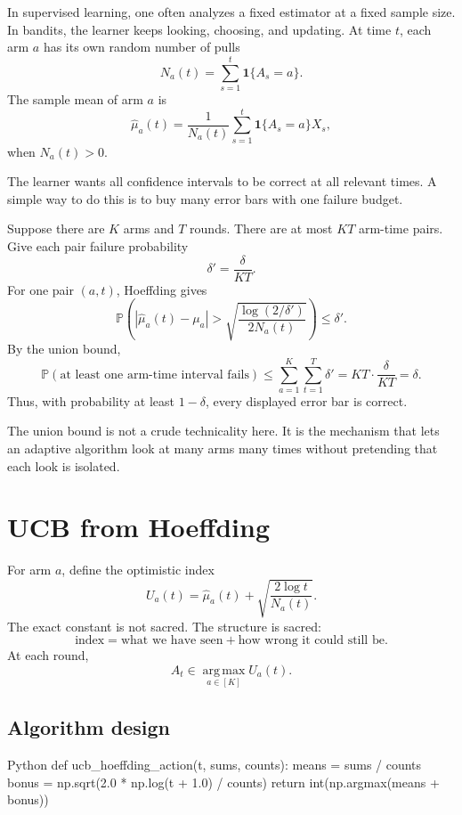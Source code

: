 \documentclass[en,nofont,11pt]{elegantbook}
\newcommand{\Pbb}{\mathbb{P}}
\newcommand{\one}{\mathbf{1}}
\newcommand{\argmax}{\operatorname*{arg\,max}}
\begin{document}
In supervised learning, one often analyzes a fixed estimator at a fixed sample size. In bandits, the learner keeps looking, choosing, and updating. At time $t$, each arm $a$ has its own random number of pulls
\[
N_a(t)=\sum_{s=1}^{t}\one\{A_s=a\}.
\]
The sample mean of arm $a$ is
\[
\widehat\mu_a(t)
=\frac{1}{N_a(t)}\sum_{s=1}^{t}\one\{A_s=a\}X_s,
\]
when $N_a(t)>0$.

The learner wants all confidence intervals to be correct at all relevant times. A simple way to do this is to buy many error bars with one failure budget.

Suppose there are $K$ arms and $T$ rounds. There are at most $KT$ arm-time pairs. Give each pair failure probability
\[
\delta' = \frac{\delta}{KT}.
\]
For one pair $(a,t)$, Hoeffding gives
\[
\Pbb\left(
|\widehat\mu_a(t)-\mu_a|
>
\sqrt{\frac{\log(2/\delta')}{2N_a(t)}}
\right)
\le \delta'.
\]
By the union bound,
\[
\Pbb\left(\text{at least one arm-time interval fails}\right)
\le
\sum_{a=1}^{K}\sum_{t=1}^{T}\delta'
=KT\cdot \frac{\delta}{KT}
=\delta.
\]
Thus, with probability at least $1-\delta$, every displayed error bar is correct.

\begin{keyidea}
The union bound is not a crude technicality here. It is the mechanism that lets an adaptive algorithm look at many arms many times without pretending that each look is isolated.
\end{keyidea}

\chapter{UCB from Hoeffding}

For arm $a$, define the optimistic index
\[
U_a(t)=\widehat\mu_a(t)+\sqrt{\frac{2\log t}{N_a(t)}}.
\]
The exact constant is not sacred. The structure is sacred:
\[
\text{index} = \text{what we have seen} + \text{how wrong it could still be}.
\]
At each round,
\[
A_t\in \argmax_{a\in[K]} U_a(t).
\]

\section{Algorithm design}

\begin{codeblock}[title={Hoeffding-UCB core rule.}]{Python}
def ucb_hoeffding_action(t, sums, counts):
    means = sums / counts
    bonus = np.sqrt(2.0 * np.log(t + 1.0) / counts)
    return int(np.argmax(means + bonus))
\end{codeblock}
\end{document}
